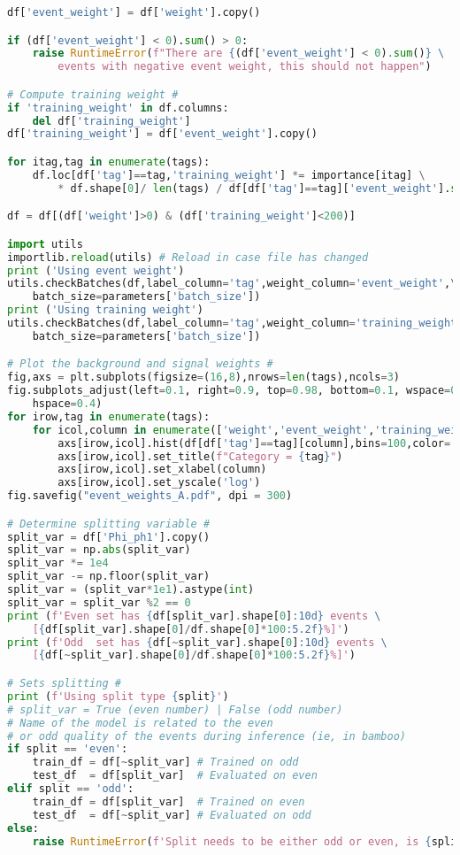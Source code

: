 \begin{lstlisting}[language=Python, caption=DNN setup for the \wwgg semi-leptonic final state, label={dnncode}]
df['event_weight'] = df['weight'].copy()

if (df['event_weight'] < 0).sum() > 0:
    raise RuntimeError(f"There are {(df['event_weight'] < 0).sum()} \
        events with negative event weight, this should not happen")

# Compute training weight #
if 'training_weight' in df.columns:
    del df['training_weight']
df['training_weight'] = df['event_weight'].copy()

for itag,tag in enumerate(tags):
    df.loc[df['tag']==tag,'training_weight'] *= importance[itag] \
        * df.shape[0]/ len(tags) / df[df['tag']==tag]['event_weight'].sum()

df = df[(df['weight']>0) & (df['training_weight']<200)]

import utils
importlib.reload(utils) # Reload in case file has changed
print ('Using event weight')
utils.checkBatches(df,label_column='tag',weight_column='event_weight',\
    batch_size=parameters['batch_size'])
print ('Using training weight')
utils.checkBatches(df,label_column='tag',weight_column='training_weight',\
    batch_size=parameters['batch_size'])

# Plot the background and signal weights #
fig,axs = plt.subplots(figsize=(16,8),nrows=len(tags),ncols=3)
fig.subplots_adjust(left=0.1, right=0.9, top=0.98, bottom=0.1, wspace=0.2,\
    hspace=0.4)
for irow,tag in enumerate(tags):
    for icol,column in enumerate(['weight','event_weight','training_weight']):
        axs[irow,icol].hist(df[df['tag']==tag][column],bins=100,color='b')
        axs[irow,icol].set_title(f"Category = {tag}")
        axs[irow,icol].set_xlabel(column)
        axs[irow,icol].set_yscale('log')
fig.savefig("event_weights_A.pdf", dpi = 300)

# Determine splitting variable #
split_var = df['Phi_ph1'].copy()
split_var = np.abs(split_var)
split_var *= 1e4
split_var -= np.floor(split_var) 
split_var = (split_var*1e1).astype(int)
split_var = split_var %2 == 0
print (f'Even set has {df[split_var].shape[0]:10d} events \
    [{df[split_var].shape[0]/df.shape[0]*100:5.2f}%]')
print (f'Odd  set has {df[~split_var].shape[0]:10d} events \
    [{df[~split_var].shape[0]/df.shape[0]*100:5.2f}%]')

# Sets splitting #
print (f'Using split type {split}')
# split_var = True (even number) | False (odd number)
# Name of the model is related to the even 
# or odd quality of the events during inference (ie, in bamboo)
if split == 'even':
    train_df = df[~split_var] # Trained on odd
    test_df  = df[split_var]  # Evaluated on even 
elif split == 'odd':
    train_df = df[split_var]  # Trained on even
    test_df  = df[~split_var] # Evaluated on odd 
else:
    raise RuntimeError(f'Split needs to be either odd or even, is {split}')


\end{lstlisting}
